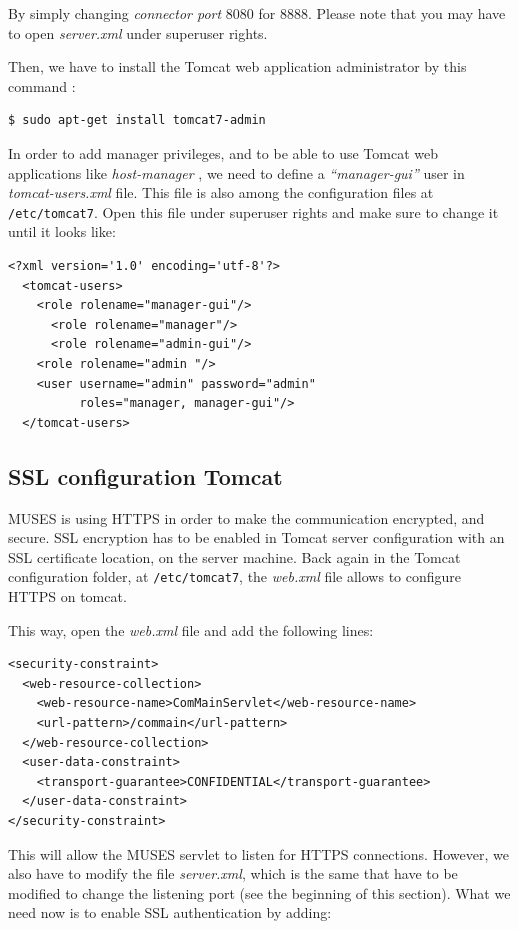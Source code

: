 \documentclass[a4paper,11pt]{book}
\begin{document}
By simply changing \textit{connector port} 8080 for 8888. Please note that you may have to open \textit{server.xml} under superuser rights.

Then, we have to install the Tomcat web application administrator by this command \cite{tomcatdocu:site}:

\begin{verbatim}
$ sudo apt-get install tomcat7-admin
\end{verbatim}

In order to add manager privileges, and to be able to use Tomcat web applications like \textit{host-manager} \cite{tomcatdocu:site}, we need to define a \textit{``manager-gui''} user in \textit{tomcat-users.xml} file. This file is also among the configuration files at \texttt{/etc/tomcat7}. Open this file under superuser rights and make sure to change it until it looks like:

\begin{verbatim}
<?xml version='1.0' encoding='utf-8'?>
  <tomcat-users>
    <role rolename="manager-gui"/>
 	  <role rolename="manager"/>
 	  <role rolename="admin-gui"/>
    <role rolename="admin "/>
    <user username="admin" password="admin"
          roles="manager, manager-gui"/>
  </tomcat-users>
\end{verbatim}

\subsection{SSL configuration Tomcat}
\label{subsec:ssltomcat}

MUSES is using HTTPS in order to make the communication encrypted, and secure. SSL encryption has to be enabled in Tomcat server configuration with an SSL certificate location, on the server machine. Back again in the Tomcat configuration folder, at \texttt{/etc/tomcat7}, the \textit{web.xml} file allows to configure HTTPS on tomcat.

This way, open the \textit{web.xml} file and add the following lines:

\begin{verbatim}
<security-constraint>
  <web-resource-collection>
    <web-resource-name>ComMainServlet</web-resource-name>
    <url-pattern>/commain</url-pattern>
  </web-resource-collection>
  <user-data-constraint>
    <transport-guarantee>CONFIDENTIAL</transport-guarantee>
  </user-data-constraint>
</security-constraint>
\end{verbatim}

This will allow the MUSES servlet to listen for HTTPS connections. However, we also have to modify the file \textit{server.xml}, which is the same that have to be modified to change the listening port (see the beginning of this section). What we need now is to enable SSL authentication by adding:
\end{document}
